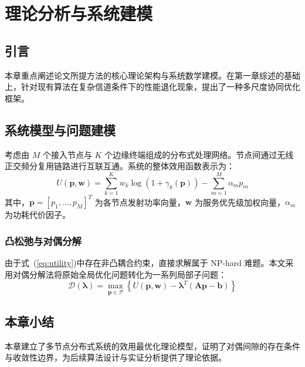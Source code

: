 
\chapter{理论分析与系统建模}

\section{引言}

本章重点阐述论文所提方法的核心理论架构与系统数学建模。在第一章综述的基础上，针对现有算法在复杂信道条件下的性能退化现象，提出了一种多尺度协同优化框架。

\section{系统模型与问题建模}

考虑由 $M$ 个接入节点与 $K$ 个边缘终端组成的分布式处理网络。节点间通过无线正交频分复用链路进行互联互通。系统的整体效用函数表示为：
\begin{equation}
  U(\mathbf{p}, \mathbf{w}) = \sum_{k=1}^K w_k \log \left( 1 + \gamma_k(\mathbf{p}) \right) - \sum_{m=1}^M \alpha_m p_m
  \label{eq:utility}
\end{equation}
其中，$\mathbf{p} = [p_1, \dots, p_M]^T$ 为各节点发射功率向量，$\mathbf{w}$ 为服务优先级加权向量，$\alpha_m$ 为功耗代价因子。

\subsection{凸松弛与对偶分解}

由于式~(\ref{eq:utility})中存在非凸耦合约束，直接求解属于 NP-hard 难题。本文采用对偶分解法将原始全局优化问题转化为一系列局部子问题：
\begin{equation}
  \mathcal{D}(\boldsymbol{\lambda}) = \max_{\mathbf{p} \in \mathcal{P}} \left\{ U(\mathbf{p}, \mathbf{w}) - \boldsymbol{\lambda}^T (\mathbf{A}\mathbf{p} - \mathbf{b}) \right\}
  \label{eq:dual}
\end{equation}

\section{本章小结}

本章建立了多节点分布式系统的效用最优化理论模型，证明了对偶间隙的存在条件与收敛性边界，为后续算法设计与实证分析提供了理论依据。
